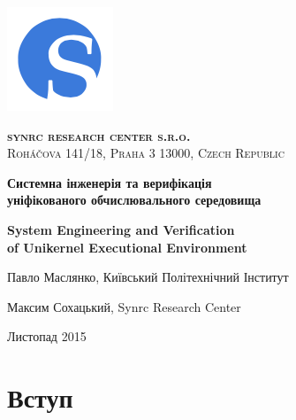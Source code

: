 \documentclass[11pt,oneside]{article}
\begin{document}
\thispagestyle{empty}
\begin{center}

\begin{minipage}[t]{2cm}
    \includegraphics[scale=0.4]{img/S}
\end{minipage}
\begin{minipage}[t]{12cm}
    \begin{flushright}
        \textsc{{\Large {\bf {\color{Blue}syn}{\color{OrangeRed}rc} research center s.r.o.}}}\\
        \textsc{Roháčova 141/18, Praha 3 13000, Czech Republic}\\
    \end{flushright}
\end{minipage}

\vspace{3cm}

    \vspace{3cm}   {\Large \bf Системна інженерія та верифікація\\ \vspace{0.2cm} уніфікованого обчислювального середовища}\par
    \vspace{1cm}   {\Large \bf System Engineering and Verification\\ \vspace{0.2cm} of Unikernel Executional Environment}\par
    \vspace{3cm}   {\Large Павло Маслянко, Київський Політехнічний Інститут\par}
    \vspace{0.3cm} {\Large Максим Сохацький, Synrc Research Center\par}
    \vspace{4cm}   {\Large Листопад 2015}

\end{center}

\vspace{2cm}
\newpage
\section{Вступ}
\end{document}
